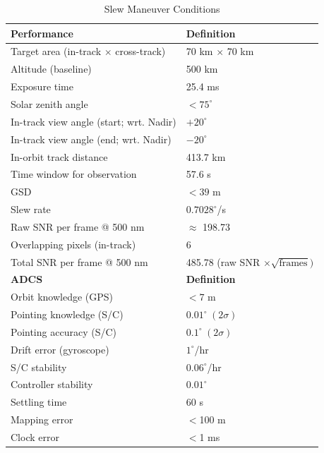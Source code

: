 \begin{table}[htbp]
	\centering
			\caption{Slew Maneuver Conditions}
		\begin{tabular}{|l|l|}
			\hline
			\textbf{Performance}	&			\textbf{Definition} 			\\ 
			\hline
			Target area (in-track $\times$ cross-track) & 70 km $\times$ 70 km \\
			Altitude (baseline) & 500 km \\
			Exposure time & 25.4 ms \\
			Solar zenith angle & $<75^{\circ}$ \\
			In-track view angle (start; wrt. Nadir) & $+20^{\circ}$ \\
			In-track view angle (end; wrt. Nadir) & $-20^{\circ}$ \\
			In-orbit track distance & 413.7 km \\
			Time window for observation & 57.6 s \\
			GSD & $<39$ m \\
			Slew rate & $0.7028^{\circ}$/s \\
			Raw SNR per frame @ 500 nm & $\approx$ 198.73 \\
			Overlapping pixels (in-track) & 6 \\
			Total SNR per frame @ 500 nm & 485.78 (raw SNR $\times \sqrt{\text{frames}})$\\
			\hline
			\textbf{ADCS}	&			\textbf{Definition} 			\\ 
			\hline
			Orbit knowledge (GPS) & $<7$ m \\
			Pointing knowledge (S/C) & $0.01^{\circ} \hspace{3pt} (2\sigma)$ \\
			Pointing accuracy (S/C) & $0.1^{\circ} \hspace{3pt} (2\sigma)$ \\
			Drift error (gyroscope) & $1^{\circ}$/hr \\
			S/C stability & $0.06^{\circ}$/hr \\
			Controller stability & $0.01^{\circ}$ \\
			Settling time & 60 s \\
			Mapping error & $<$100 m \\
			Clock error & $<$1 ms \\
			\hline
		\end{tabular}
	  \label{tab:ADCS_requirement}
\end{table}

